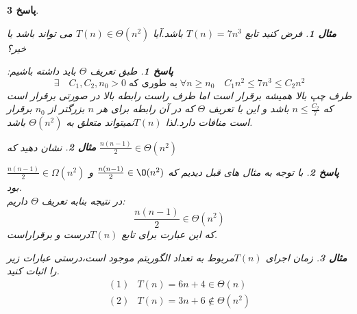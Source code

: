 \documentclass[12pt]{article}
\newtheorem{question}{مثال}[section]
\newtheorem{answer}{پاسخ}[section]
\newcommand{\func}{$T(n)$}
\begin{document}
\begin{answer}
\begin{question}
فرض کنید تابع $T(n) = 7n^3$ باشد.آيا $T(n) \in \Theta (n^2)$
می تواند باشد یا خیر؟
\end{question}

\begin{answer}
طبق تعریف $\Theta$ باید داشته باشیم:
\[
\exists \quad C_1,C_2,n_0 > 0\; \text{به طوری که} \;\forall n\ge n_0 \quad C_1 n^2 \le 7n^3 \le C_2n^2
\]
طرف چپ بالا همیشه برقرار است اما طرف راست رابطه بالا در صورتی برقرار است که 
$n \le \frac{C_2}{7}$
باشد و این با تعریف $\Theta$ که در آن رابطه برای هر $n$ بزرگتر از $n_0$ برقرار است منافات دارد.لذا \func نمیتواند متعلق به 
$\Theta (n^2)$
باشد.
\end{answer}
\begin{question}
نشان دهید که 
$\frac{n(n-1)}{2} \in \Theta (n^2)$
\end{question}
\begin{answer}
با توجه به مثال های قبل دیدیم که $\frac{n(n-1)}{2} \in \O (n^2)$
و $\frac{n(n-1)}{2} \in \Omega (n^2)$ بود.\\
در نتیجه  بنابه تعریف $\Theta$ داریم:\\
\[
\frac{n(n-1)}{2} \in \Theta (n^2)
\]
که این عبارت برای تابع \func درست و برقراراست.\\
\end{answer}
\begin{question}
زمان اجرای \func مربوط به تعداد الگوریتم موجود است،درستی عبارات زیر را اثبات کنید.
\begin{align*}
(1)&T(n) = 6n + 4 \in \Theta(n) \\
(2)&T(n) = 3n + 6 \notin \Theta(n^2)
\end{align*}
\end{question}


\end{answer}
\end{document}
